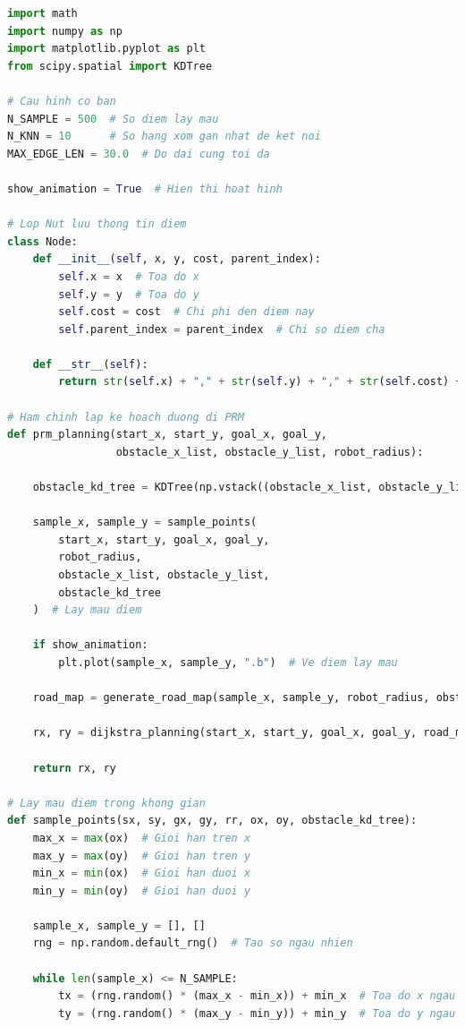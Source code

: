 \documentclass[12pt,a4paper,openany,oneside]{report}
\begin{document}
\begin{lstlisting}[language=Python, caption=Cài đặt thuật toán PRM bằng Python]
import math
import numpy as np
import matplotlib.pyplot as plt
from scipy.spatial import KDTree

# Cau hinh co ban
N_SAMPLE = 500  # So diem lay mau
N_KNN = 10      # So hang xom gan nhat de ket noi
MAX_EDGE_LEN = 30.0  # Do dai cung toi da

show_animation = True  # Hien thi hoat hinh

# Lop Nut luu thong tin diem
class Node:
    def __init__(self, x, y, cost, parent_index):
        self.x = x  # Toa do x
        self.y = y  # Toa do y
        self.cost = cost  # Chi phi den diem nay
        self.parent_index = parent_index  # Chi so diem cha

    def __str__(self):
        return str(self.x) + "," + str(self.y) + "," + str(self.cost) + "," + str(self.parent_index)

# Ham chinh lap ke hoach duong di PRM
def prm_planning(start_x, start_y, goal_x, goal_y,
                 obstacle_x_list, obstacle_y_list, robot_radius):
    
    obstacle_kd_tree = KDTree(np.vstack((obstacle_x_list, obstacle_y_list)).T)  # Tao KDTree cho vat can

    sample_x, sample_y = sample_points(
        start_x, start_y, goal_x, goal_y,
        robot_radius,
        obstacle_x_list, obstacle_y_list,
        obstacle_kd_tree
    )  # Lay mau diem

    if show_animation:
        plt.plot(sample_x, sample_y, ".b")  # Ve diem lay mau

    road_map = generate_road_map(sample_x, sample_y, robot_radius, obstacle_kd_tree)  # Tao ban do duong di

    rx, ry = dijkstra_planning(start_x, start_y, goal_x, goal_y, road_map, sample_x, sample_y)  # Tim duong di ngan nhat

    return rx, ry

# Lay mau diem trong khong gian
def sample_points(sx, sy, gx, gy, rr, ox, oy, obstacle_kd_tree):
    max_x = max(ox)  # Gioi han tren x
    max_y = max(oy)  # Gioi han tren y
    min_x = min(ox)  # Gioi han duoi x
    min_y = min(oy)  # Gioi han duoi y

    sample_x, sample_y = [], []
    rng = np.random.default_rng()  # Tao so ngau nhien

    while len(sample_x) <= N_SAMPLE:
        tx = (rng.random() * (max_x - min_x)) + min_x  # Toa do x ngau nhien
        ty = (rng.random() * (max_y - min_y)) + min_y  # Toa do y ngau nhien


\end{lstlisting}
\end{document}
